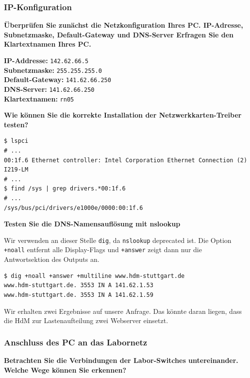 \hypertarget{ip-konfiguration}{%
\subsubsection{IP-Konfiguration}\label{ip-konfiguration}}

\textbf{Überprüfen Sie zunächst die Netzkonfiguration Ihres PC.
IP-Adresse, Subnetzmaske, Default-Gateway und DNS-Server Erfragen Sie
den Klartextnamen Ihres PC.}

\textbf{IP-Addresse:} \texttt{142.62.66.5}\\
\textbf{Subnetzmaske:} \texttt{255.255.255.0}\\
\textbf{Default-Gateway:} \texttt{141.62.66.250}\\
\textbf{DNS-Server:} \texttt{141.62.66.250}\\
\textbf{Klartextnamen:} \texttt{rn05}

\textbf{Wie können Sie die korrekte Installation der
Netzwerkkarten-Treiber testen?}

\begin{verbatim}
$ lspci
# ...
00:1f.6 Ethernet controller: Intel Corporation Ethernet Connection (2) I219-LM
# ...
$ find /sys | grep drivers.*00:1f.6
# ...
/sys/bus/pci/drivers/e1000e/0000:00:1f.6
\end{verbatim}

\textbf{Testen Sie die DNS-Namensauflösung mit nslookup}

Wir verwenden an dieser Stelle \texttt{dig}, da \texttt{nslookup}
deprecated ist. Die Option \texttt{+noall} entfernt alle Display-Flags
und \texttt{+answer} zeigt dann nur die Antwortsektion des Outputs an.

\begin{verbatim}
$ dig +noall +answer +multiline www.hdm-stuttgart.de
www.hdm-stuttgart.de. 3553 IN A 141.62.1.53
www.hdm-stuttgart.de. 3553 IN A 141.62.1.59
\end{verbatim}

Wir erhalten zwei Ergebnisse auf unsere Anfrage. Das könnte daran
liegen, dass die HdM zur Lastenaufteilung zwei Webserver einsetzt.

\hypertarget{anschluss-des-pc-an-das-labornetz}{%
\subsubsection{Anschluss des PC an das
Labornetz}\label{anschluss-des-pc-an-das-labornetz}}

\textbf{Betrachten Sie die Verbindungen der Labor-Switches
untereinander. Welche Wege können Sie erkennen?}

